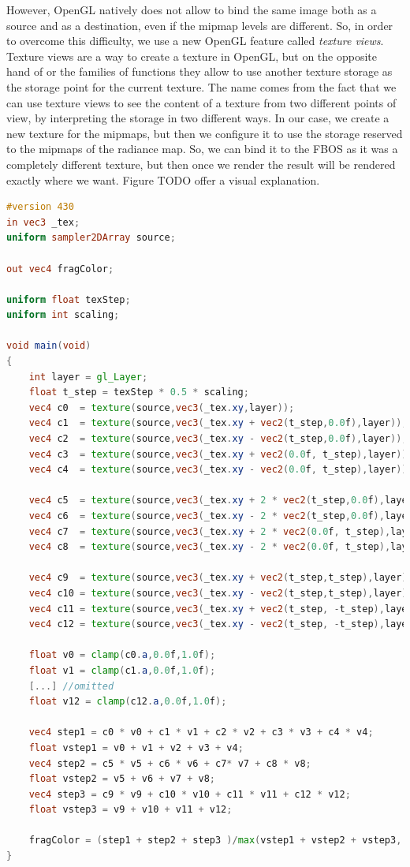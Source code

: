 However, OpenGL natively does not allow to bind the same image both as a source and as a destination, even if the mipmap levels are different. So, in order to overcome this difficulty, we use a new OpenGL feature called \emph{texture views}. Texture views are a way to create a texture in OpenGL, but on the opposite hand of  or the  families of functions they allow to use another texture storage as the storage point for the current texture. The name comes from the fact that we can use texture views to see the content of a texture from two different points of view, by interpreting the storage in two different ways. In our case, we create a new texture for the mipmaps, but then we configure it to use the storage reserved to the mipmaps of the radiance map. So, we can bind it to the FBOS as it was a completely different texture, but then once we render the result will be rendered exactly where we want. Figure TODO offer a visual explanation.

\begin{lstlisting}[language=GLSL,label=lst:shaderimageprocessing,caption={Custom mipmap filtering on GPU. \gl{_tex} are the texture coordinates on the screen aligned quad.}]
#version 430
in vec3 _tex;
uniform sampler2DArray source;

out vec4 fragColor;

uniform float texStep;
uniform int scaling;

void main(void)
{
	int layer = gl_Layer;
	float t_step = texStep * 0.5 * scaling;
	vec4 c0  = texture(source,vec3(_tex.xy,layer));
	vec4 c1  = texture(source,vec3(_tex.xy + vec2(t_step,0.0f),layer));
	vec4 c2  = texture(source,vec3(_tex.xy - vec2(t_step,0.0f),layer));
	vec4 c3  = texture(source,vec3(_tex.xy + vec2(0.0f, t_step),layer));
	vec4 c4  = texture(source,vec3(_tex.xy - vec2(0.0f, t_step),layer));

	vec4 c5  = texture(source,vec3(_tex.xy + 2 * vec2(t_step,0.0f),layer));
	vec4 c6  = texture(source,vec3(_tex.xy - 2 * vec2(t_step,0.0f),layer));
	vec4 c7  = texture(source,vec3(_tex.xy + 2 * vec2(0.0f, t_step),layer));
	vec4 c8  = texture(source,vec3(_tex.xy - 2 * vec2(0.0f, t_step),layer));

	vec4 c9  = texture(source,vec3(_tex.xy + vec2(t_step,t_step),layer));
	vec4 c10 = texture(source,vec3(_tex.xy - vec2(t_step,t_step),layer));
	vec4 c11 = texture(source,vec3(_tex.xy + vec2(t_step, -t_step),layer));
	vec4 c12 = texture(source,vec3(_tex.xy - vec2(t_step, -t_step),layer));

	float v0 = clamp(c0.a,0.0f,1.0f);
	float v1 = clamp(c1.a,0.0f,1.0f);
	[...] //omitted
	float v12 = clamp(c12.a,0.0f,1.0f);

	vec4 step1 = c0 * v0 + c1 * v1 + c2 * v2 + c3 * v3 + c4 * v4;
	float vstep1 = v0 + v1 + v2 + v3 + v4;
	vec4 step2 = c5 * v5 + c6 * v6 + c7* v7 + c8 * v8;
	float vstep2 = v5 + v6 + v7 + v8;
	vec4 step3 = c9 * v9 + c10 * v10 + c11 * v11 + c12 * v12;
	float vstep3 = v9 + v10 + v11 + v12;

	fragColor = (step1 + step2 + step3 )/max(vstep1 + vstep2 + vstep3, 1.0f);
}
\end{lstlisting}
